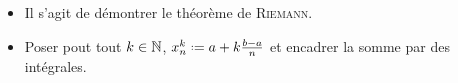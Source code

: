 \begin{itemize}
    \item Il s'agit de démontrer le théorème de \textsc{Riemann}. 
    \item Poser pout tout $k \in \mathbb{N}$, $x_n^k \defeq a+k\frac{b-a}{n}$ et encadrer la somme par des intégrales. 
\end{itemize}

\begin{marginfigure}
    
\end{marginfigure}
